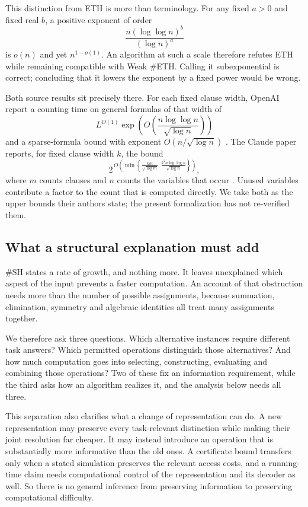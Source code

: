 \documentclass[11pt,letterpaper]{article}
\begin{document}
This distinction from ETH is more than terminology. For any fixed
\(a>0\) and fixed real \(b\), a positive exponent of order
\[\frac{n(\log\log n)^b}{(\log n)^a}\] is \(o(n)\) and yet
\(n^{1-o(1)}\). An algorithm at such a scale therefore refutes ETH while
remaining compatible with Weak \#ETH. Calling it subexponential is
correct; concluding that it lowers the exponent by a fixed power would
be wrong.

Both source results sit precisely there. For each fixed clause width,
OpenAI report a counting time on general formulas of that width of
\[L^{O(1)}\exp\!\left(O\!\left(\frac{n\log\log n}{\sqrt{\log n}}\right)\right)\]
and a sparse-formula bound with exponent \(O(n/\sqrt{\log n})\)
\citep{O26}. The Claude paper reports, for fixed clause width \(k\), the
bound \[2^{\,O\!\left(\min\left\{
\frac{km}{\sqrt{\log m}},
\frac{k^2 n\log\log n}{\sqrt{\log n}}
\right\}\right)},\] where \(m\) counts clauses and \(n\) counts the
variables that occur \citep{Ant26}. Unused variables contribute a factor
to the count that is computed directly. We take both as the upper bounds
their authors state; the present formalization has not re-verified them.

\subsection{What a structural explanation must
add}\label{what-a-structural-explanation-must-add}

\#SH states a rate of growth, and nothing more. It leaves unexplained
which aspect of the input prevents a faster computation. An account of
that obstruction needs more than the number of possible assignments,
because summation, elimination, symmetry and algebraic identities all
treat many assignments together.

We therefore ask three questions. Which alternative instances require
different task answers? Which permitted operations distinguish those
alternatives? And how much computation goes into selecting,
constructing, evaluating and combining those operations? Two of these
fix an information requirement, while the third asks how an algorithm
realizes it, and the analysis below needs all three.

This separation also clarifies what a change of representation can do. A
new representation may preserve every task-relevant distinction while
making their joint resolution far cheaper. It may instead introduce an
operation that is substantially more informative than the old ones. A
certificate bound transfers only when a stated simulation preserves the
relevant access costs, and a running-time claim needs computational
control of the representation and its decoder as well. So there is no
general inference from preserving information to preserving
computational difficulty.
\end{document}
